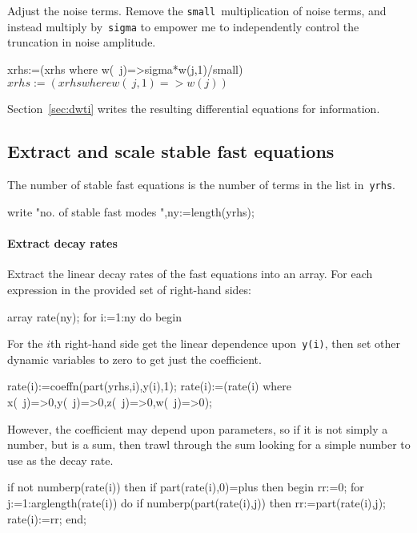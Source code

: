\documentclass[11pt,a5paper]{article}
\begin{document}
Adjust the noise terms.
Remove the \verb|small|~multiplication of noise terms, and instead multiply by~\verb|sigma| to empower me to independently control the truncation in noise amplitude.
\begin{reduce}
xrhs:=(xrhs where w(~j)=>sigma*w(j,1)/small)$
xrhs:=(xrhs where w(~j,1)=>w(j))$
\end{reduce}

Section~\ref{sec:dwti} writes the resulting differential equations for information.


\subsection{Extract and scale stable fast equations}

The number of stable fast equations is the number of terms in the list in~\verb|yrhs|.
\begin{reduce}
write "no. of stable fast modes ",ny:=length(yrhs);
\end{reduce}

\paragraph{Extract decay rates}
Extract the linear decay rates of the fast equations into an array.
For each expression in the provided set of right-hand sides:
\begin{reduce}
array rate(ny);
for i:=1:ny do begin
\end{reduce}

For the $i$th right-hand side get the linear dependence upon~\verb|y(i)|, then set other dynamic variables to zero to get just the coefficient.
\begin{reduce}
  rate(i):=coeffn(part(yrhs,i),y(i),1);
  rate(i):=(rate(i) where {x(~j)=>0,y(~j)=>0,z(~j)=>0,w(~j)=>0});
\end{reduce}

However, the coefficient may depend upon parameters, so if it is not simply a number, but is a sum, then trawl through the sum looking for a simple number to use as the decay rate.
\begin{reduce}
  if not numberp(rate(i)) then 
  if part(rate(i),0)=plus then begin
    rr:=0;
    for j:=1:arglength(rate(i)) do 
      if numberp(part(rate(i),j)) 
      then rr:=part(rate(i),j);
    rate(i):=rr;
  end;
\end{reduce}
\end{document}
